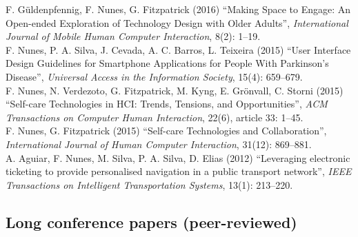 \documentclass[11pt, a4paper]{article} %
\newcommand{\years}[1]{\marginnote{\scriptsize #1}} %
\begin{document}
\years{2016}F. Güldenpfennig, F. Nunes, G. Fitzpatrick (2016) ``Making Space to Engage: An Open-ended Exploration of Technology Design with Older Adults'', \emph{International Journal of Mobile Human Computer Interaction}, 8(2): 1--19.\\
\years{2016}F. Nunes, P. A. Silva, J. Cevada, A. C. Barros, L. Teixeira (2015) ``User Interface Design Guidelines for Smartphone Applications for People With Parkinson's Disease'', \emph{Universal Access in the Information Society}, 15(4): 659--679.\\
\years{2015}F. Nunes, N. Verdezoto, G. Fitzpatrick, M. Kyng, E. Grönvall, C. Storni (2015) ``Self-care Technologies in HCI: Trends, Tensions, and Opportunities'', \emph{ACM Transactions on Computer Human Interaction}, 22(6), article 33: 1--45.\\
\years{2015}F. Nunes, G. Fitzpatrick (2015) ``Self-care Technologies and Collaboration'', \emph{International Journal of Human Computer Interaction}, 31(12): 869--881.\\
\years{2012}A. Aguiar, F. Nunes, M. Silva, P. A. Silva, D. Elias (2012) ``Leveraging electronic ticketing to provide personalised navigation in a public transport network'', \emph{IEEE Transactions on Intelligent Transportation Systems}, 13(1): 213--220.


\subsection*{Long conference papers (peer-reviewed)}
\end{document}
